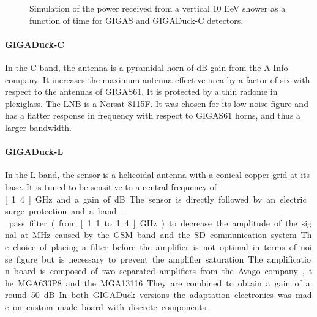 \begin{figure}[!t]
  \centering
  \hspace*{-3ex}  
  \caption{Simulation  of the power  received from  a vertical  10 EeV
    shower  as a  function  of time  for  GIGAS and  \mbox{GIGADuck-C}
    detectors.}
  \label{fig:simexample}  
\end{figure}

\paragraph{GIGADuck-C} 
In the C-band,  the antenna is a pyramidal  horn of \unit[15]{dB} gain
from the  A-Info company. It  increases the maximum  antenna effective
area by a  factor of six with respect to the  antennas of \mbox{GIGAS61}.  It
is protected  by a  thin radome  in plexiglass.  The  LNB is  a Norsat
8115F.   It was  chosen for  its low  noise figure  and has  a flatter
response in frequency with respect to \mbox{GIGAS61} horns, and thus a larger
bandwidth.

\paragraph{GIGADuck-L}
In  the L-band,  the sensor  is a  helicoidal antenna  with  a conical
copper grid  at its  base. It is  tuned to  be sensitive to  a central
frequency of  \unit[1.4]{GHz} and a gain of  \unit[15]{dB}. The sensor
is directly followed  by an electric surge protection  and a band-pass
filter (from \unit[1.1 to 1.4]{GHz})  to decrease the amplitude of the
signal  at  \unit[900]{MHz}  caused  by   the  GSM  band  and  the  SD
communication  system.  The  choice  of placing  a  filter before  the
amplifier is not optimal in terms  of noise figure but is necessary to
prevent the amplifier saturation.  The amplification board is composed
of two separated  amplifiers from the Avago company,  the MGA633P8 and
the MGA13116.  They are combined to  obtain a gain of around 50~dB. In
both GIGADuck  versions the adaptation  electronics was made  on custom
made board with discrete components. 
